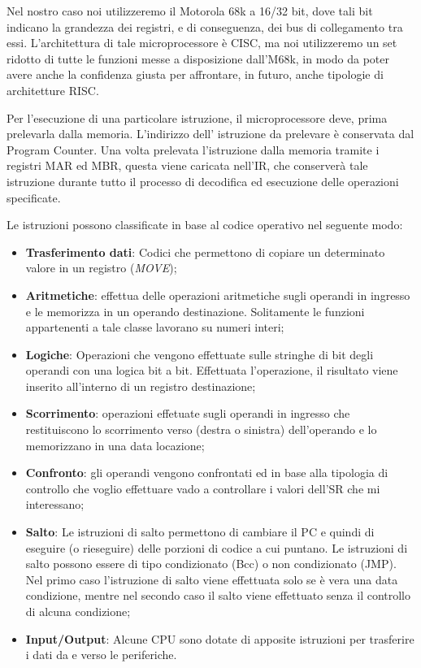 Nel nostro caso noi utilizzeremo il Motorola 68k a 16/32 bit, dove tali bit indicano la grandezza dei registri, e di conseguenza, dei bus di collegamento tra essi. L'architettura di tale microprocessore è CISC, ma noi utilizzeremo un set ridotto di tutte le funzioni messe a disposizione dall'M68k, in modo da poter avere anche la confidenza giusta per affrontare, in futuro, anche tipologie di architetture RISC.

Per l'esecuzione di una particolare istruzione, il microprocessore deve, prima prelevarla dalla memoria. L'indirizzo dell' istruzione da prelevare è conservata dal Program Counter. Una volta prelevata l'istruzione dalla memoria tramite i registri MAR ed MBR, questa viene caricata nell'IR, che conserverà tale istruzione durante tutto il processo di decodifica ed esecuzione delle operazioni specificate.

Le istruzioni possono classificate in base al codice operativo nel seguente modo:

\begin{itemize}
    \item \textbf{Trasferimento dati}: Codici che permettono di copiare un determinato valore in un registro (\textit{MOVE});

    \item \textbf{Aritmetiche}: effettua delle operazioni aritmetiche sugli operandi in ingresso e le memorizza in un operando destinazione. Solitamente le funzioni appartenenti a tale classe lavorano su numeri interi;

    \item \textbf{Logiche}: Operazioni che vengono effettuate sulle stringhe di bit degli operandi con una logica bit a bit. Effettuata l'operazione, il risultato viene inserito all'interno di un registro destinazione;

    \item \textbf{Scorrimento}: operazioni effetuate sugli operandi in ingresso che restituiscono lo scorrimento verso (destra o sinistra) dell'operando e lo memorizzano in una data locazione;

    \item \textbf{Confronto}: gli operandi vengono confrontati ed in base alla tipologia di controllo che voglio effettuare vado a controllare i valori dell'SR che mi interessano;

    \item \textbf{Salto}: Le istruzioni di salto permettono di cambiare il PC e quindi di eseguire (o rieseguire) delle porzioni di codice a cui puntano. Le istruzioni di salto possono essere di tipo condizionato (Bcc) o non condizionato (JMP). Nel primo caso l'istruzione di salto viene effettuata solo se è vera una data condizione, mentre nel secondo caso il salto viene effettuato senza il controllo di alcuna condizione;

    \item \textbf{Input/Output}: Alcune CPU sono dotate di apposite istruzioni per trasferire i dati da e verso le periferiche.
\end{itemize}
